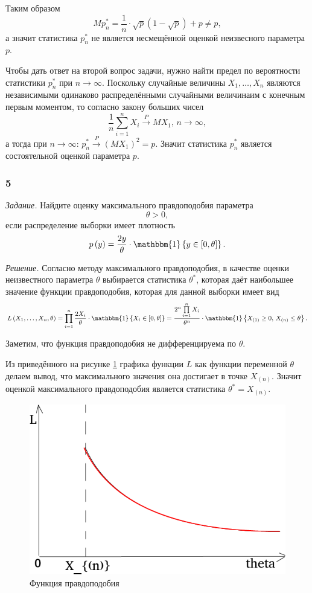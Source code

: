 Таким образом
$$Mp_n^* =
  \frac{1}{n} \cdot \sqrt{p} \left( 1 - \sqrt{p} \right) + p \neq
  p,$$
а значит статистика $p_n^*$ не является несмещённой оценкой неизвесного параметра $p$.

Чтобы дать ответ на второй вопрос задачи,
нужно найти предел по вероятности статистики $p_n^*$ при $n \to \infty $.
Поскольку случайные величины $X_1, \dotsc, X_n$
являются независимыми одинаково распределёнными случайными величинаим с конечным первым моментом,
то согласно закону больших чисел
$$ \frac{1}{n} \sum \limits_{i = 1}^n X_i \overset{P}{ \rightarrow } MX_1, \,
  n \to \infty,$$
а тогда при $n \to \infty: \, p_n^* \overset{P}{ \rightarrow } \left( MX_1 \right)^2 = p$.
Значит статистика $p_n^*$ является состоятельной оценкой параметра $p$.


\subsubsection*{5}

\textit{Задание.}
Найдите оценку максимального правдоподобия параметра
$$ \theta >
  0,$$
если распределение выборки имеет плотность
$$p \left( y \right) =
  \frac{2y}{ \theta } \cdot \mathbbm{1} \left\{ y \in \left[ 0, \theta \right] \right\}.$$

\textit{Решение.} Согласно методу максимального правдоподобия,
в качестве оценки неизвестного параметра $ \theta $ выбирается статистика $ \theta^*$,
которая даёт наибольшее значение функции правдоподобия, которая для данной выборки имеет вид
$$L \left( X_1, \dotsc, X_n, \theta \right) =
  \prod \limits_{i = 1}^n
    \frac{2X_i}{ \theta } \cdot \mathbbm{1} \left\{ X_i \in \left[ 0, \theta \right] \right\} =
  \frac{2^n \prod \limits_{i = 1}^n X_i}{ \theta^{n}} \cdot
  \mathbbm{1}
    \left\{ X_{ \left( 1 \right) } \geq 0, \, X_{ \left( n \right) } \leq \theta \right\}.$$

Заметим, что функция правдоподобия не дифференцируема по $ \theta $.

Из  приведённого на рисунке \ref{fig:5} графика функции $L$ как функции переменной $ \theta $
делаем вывод, что максимального значения она достигает в точке $X_{ \left( n \right) }$.
Значит оценкой максимального правдоподобия является статистика $ \theta^* = X_{ \left( n \right) }$.

\begin{figure}[h!]
  \centering
  \includegraphics[width=.4\textwidth]{./pictures/v1_5.png}
  \caption{Функция правдоподобия}
  \label{fig:5}
\end{figure}

